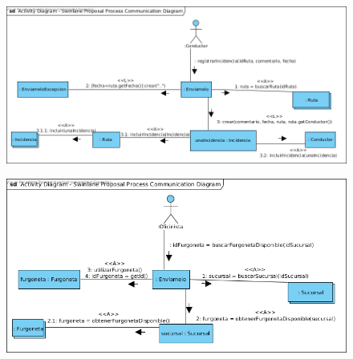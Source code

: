 \begin{figure}[H]
	\centering
	\includegraphics[width=16cm]{8}
\end{figure}
\begin{figure}[H]
	\centering
	\includegraphics[width=16cm]{9}
\end{figure}

\newpage

